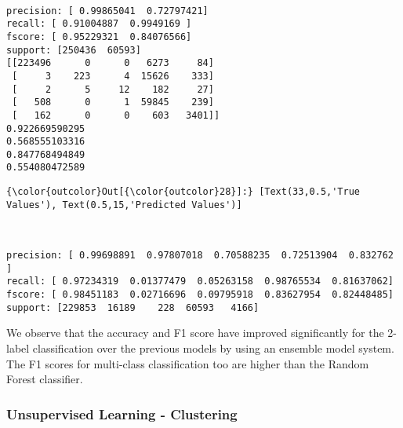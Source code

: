 \documentclass[11pt]{article}
\begin{document}
    \begin{center}
    \end{center}
    { \hspace*{\fill} \\}
    
    \begin{Verbatim}[commandchars=\\\{\}]
precision: [ 0.99865041  0.72797421]
recall: [ 0.91004887  0.9949169 ]
fscore: [ 0.95229321  0.84076566]
support: [250436  60593]
[[223496      0      0   6273     84]
 [     3    223      4  15626    333]
 [     2      5     12    182     27]
 [   508      0      1  59845    239]
 [   162      0      0    603   3401]]
0.922669590295
0.568555103316
0.847768494849
0.554080472589

    \end{Verbatim}

\begin{Verbatim}[commandchars=\\\{\}]
{\color{outcolor}Out[{\color{outcolor}28}]:} [Text(33,0.5,'True Values'), Text(0.5,15,'Predicted Values')]
\end{Verbatim}
            
    \begin{center}
    \end{center}
    { \hspace*{\fill} \\}
    
    \begin{Verbatim}[commandchars=\\\{\}]
precision: [ 0.99698891  0.97807018  0.70588235  0.72513904  0.832762  ]
recall: [ 0.97234319  0.01377479  0.05263158  0.98765534  0.81637062]
fscore: [ 0.98451183  0.02716696  0.09795918  0.83627954  0.82448485]
support: [229853  16189    228  60593   4166]

    \end{Verbatim}

    We observe that the accuracy and F1 score have improved significantly
for the 2-label classification over the previous models by using an
ensemble model system. The F1 scores for multi-class classification too
are higher than the Random Forest classifier.

    \subsubsection{Unsupervised Learning -
Clustering}\label{unsupervised-learning---clustering}
\end{document}
